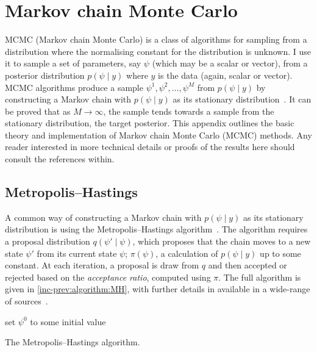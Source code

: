 \documentclass[thesis.tex]{subfiles}
\begin{document}
\chapter{Markov chain Monte Carlo} \label{MCMC}

MCMC (Markov chain Monte Carlo) is a class of algorithms for sampling from a distribution where the normalising constant for the distribution is unknown.
I use it to sample a set of parameters, say $\psi$ (which may be a scalar or vector), from a posterior distribution $p(\psi \mid y)$ where $y$ is the data (again, scalar or vector).
MCMC algorithms produce a sample $\psi^1, \psi^2, \dots, \psi^M$ from $p(\psi \mid y)$ by constructing a Markov chain with $p(\psi \mid y)$ as its stationary distribution~\autocite[275]{gelmanBDA}.
It can be proved that as $M\to\infty$, the sample tends towards a sample from the stationary distribution, \ie the target posterior.
This appendix outlines the basic theory and implementation of Markov chain Monte Carlo (MCMC) methods.
Any reader interested in more technical details or proofs of the results here should consult the references within.

\section{Metropolis--Hastings}

A common way of constructing a Markov chain with $p(\psi \mid y)$ as its stationary distribution is using the Metropolis--Hastings algorithm~\autocite{hastingsMCMC}.
The algorithm requires a proposal distribution $q(\psi' \mid \psi)$, which proposes that the chain moves to a new state $\psi'$ from its current state $\psi$; $\pi(\psi)$, a calculation of $p(\psi \mid y)$ up to some constant.
At each iteration, a proposal is draw from $q$ and then accepted or rejected based on the \emph{acceptance ratio}, computed using $\pi$.
The full algorithm is given in \cref{inc-prev:algorithm:MH}, with further details in available in a wide-range of sources~\autocites[e.g.][]{brooksMCMCNotes}[chapter 11]{gelmanBDA}.
\begin{algorithm}
 set $\psi^0$ to some initial value\;
 \caption{The Metropolis--Hastings algorithm.}
 \label{inc-prev:algorithm:MH}
\end{algorithm}
\end{document}
